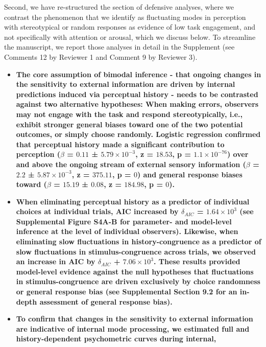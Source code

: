 \documentclass[
]{article}
\begin{document}
Second, we have re-structured the section of defensive analyses, where
we contrast the phenomenon that we identify as fluctuating modes in
perception with stereotypical or random responses as evidence of low
task engagement, and not specifically with attention or arousal, which
we discuss below. To streamline the manuscript, we report those analyses
in detail in the Supplement (see Comments 12 by Reviewer 1 and Comment 9
by Reviewer 3).

\begin{itemize}
\item
  \textbf{The core assumption of bimodal inference - that ongoing
  changes in the sensitivity to external information are driven by
  internal predictions induced via perceptual history - needs to be
  contrasted against two alternative hypotheses: When making errors,
  observers may not engage with the task and respond stereotypically,
  i.e., exhibit stronger general biases toward one of the two potential
  outcomes, or simply choose randomly. Logistic regression confirmed
  that perceptual history made a significant contribution to perception
  (\(\beta\) = \(0.11\) ± \(\ensuremath{5.79\times 10^{-3}}\), z =
  \(18.53\), p = \(\ensuremath{1.1\times 10^{-76}}\)) over and above the
  ongoing stream of external sensory information (\(\beta\) = \(2.2\) ±
  \(\ensuremath{5.87\times 10^{-3}}\), z = \(375.11\), p = \(0\)) and
  general response biases toward (\(\beta\) = \(15.19\) ± \(0.08\), z =
  \(184.98\), p = \(0\)).}
\item
  \textbf{When eliminating perceptual history as a predictor of
  individual choices at individual trials, AIC increased by
  \(\delta_{AIC}\) = \ensuremath{1.64\times 10^{3}} (see Supplemental
  Figure S4A-B for parameter- and model-level inference at the level of
  individual observers). Likewise, when eliminating slow fluctuations in
  history-congruence as a predictor of slow fluctuations in
  stimulus-congruence across trials, we observed an increase in AIC by
  \(\delta_{AIC}\) + \ensuremath{7.06\times 10^{3}}. These results
  provided model-level evidence against the null hypotheses that
  fluctuations in stimulus-congruence are driven exclusively by choice
  randomness or general response bias (see Supplemental Section 9.2 for
  an in-depth assessment of general response bias).}
\item
  \textbf{To confirm that changes in the sensitivity to external
  information are indicative of internal mode processing, we estimated
  full and history-dependent psychometric curves during internal,
}
\end{itemize}
\end{document}
